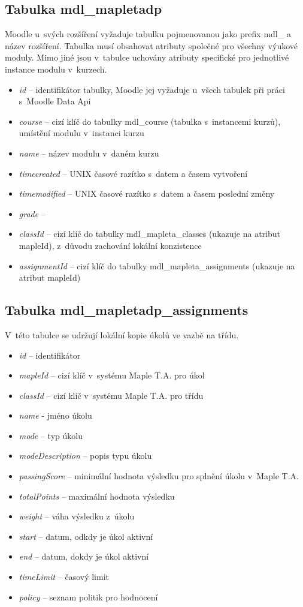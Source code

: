 \documentclass[
print,
  11pt,
  table,   
  nolof,    
  nolot,
  oneside,
  draft
]{fithesis3}
\begin{document}
\subsection*{Tabulka mdl\_mapletadp}
Moodle u~svých rozšíření vyžaduje tabulku pojmenovanou jako prefix mdl\_ a název rozšíření. Tabulka musí obsahovat atributy společné pro všechny výukové moduly. Mimo jiné jsou v~tabulce uchovány atributy specifické pro jednotlivé instance modulu v~kurzech.
\begin{itemize}
	\item \textit{id} -- identifikátor tabulky, Moodle jej vyžaduje u~všech tabulek při práci s~Moodle Data Api 
	\item \textit{course} -- cizí klíč do tabulky mdl\_course (tabulka s~instancemi kurzů), umístění modulu v~instanci kurzu 
	\item \textit{name} -- název modulu v~daném kurzu
	\item \textit{timecreated} -- UNIX časové razítko s~datem a časem vytvoření
	\item \textit{timemodified} -- UNIX časové razítko s~datem a časem poslední změny
	\item \textit{grade} -- 
	\item \textit{classId} -- cizí klíč do tabulky mdl\_mapleta\_classes (ukazuje na atribut mapleId), z~důvodu zachování lokální konzistence
	\item \textit{assignmentId} -- cizí klíč do tabulky mdl\_mapleta\_assignments (ukazuje na atribut mapleId)
\end{itemize}

\subsection*{Tabulka mdl\_mapletadp\_assignments}
V~této tabulce se udržují lokální kopie úkolů ve vazbě na třídu.
\begin{itemize}
	\item \textit{id} -- identifikátor
	\item \textit{mapleId} -- cizí klíč v~systému Maple T.A. pro úkol
	\item \textit{classId} -- cizí klíč v~systému Maple T.A. pro třídu
	\item \textit{name} -  jméno úkolu
	\item \textit{mode} -- typ úkolu
	\item \textit{modeDescription} -- popis typu úkolu
	\item \textit{passingScore} -- minimální hodnota výsledku pro splnění úkolu v~Maple T.A.
	\item \textit{totalPoints} -- maximální hodnota výsledku
	\item \textit{weight} -- váha výsledku z~úkolu
	\item \textit{start} -- datum, odkdy je úkol aktivní
	\item \textit{end} -- datum, dokdy je úkol aktivní
	\item \textit{timeLimit} -- časový limit
	\item \textit{policy} -- seznam politik pro hodnocení
\end{itemize}
\end{document}
